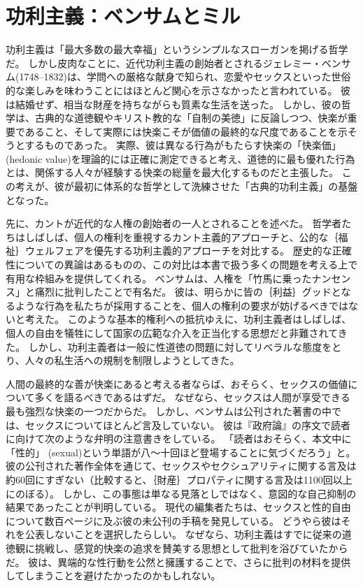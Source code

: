 \documentclass[paper=a4,book,openany]{jlreq}
\begin{document}
\section{功利主義：ベンサムとミル}

功利主義は「最大多数の最大幸福」というシンプルなスローガンを掲げる哲学だ。
しかし皮肉なことに、近代功利主義の創始者とされるジェレミー・ベンサム(1748--1832)は、学問への厳格な献身で知られ、恋愛やセックスといった世俗的な楽しみを味わうことにはほとんど関心を示さなかったと言われている。
彼は結婚せず、相当な財産を持ちながらも質素な生活を送った。
しかし、彼の哲学は、古典的な道徳観やキリスト教的な「自制の美徳」に反論しつつ、快楽が重要であること、そして実際には快楽こそが価値の最終的な尺度であることを示そうとするものであった。
実際、彼は異なる行為がもたらす快楽の「快楽価」(hedonic value)を理論的には正確に測定できると考え、道徳的に最も優れた行為とは、関係する人々が経験する快楽の総量を最大化するものだと主張した。
この考えが、彼が最初に体系的な哲学として洗練させた「古典的功利主義」の基盤となった。

先に、カントが近代的な人権の創始者の一人とされることを述べた。
哲学者たちはしばしば、個人の権利を重視するカント主義的アプローチと、公的な｛福祉｝{ウェルフェア}を優先する功利主義的アプローチを対比する。
歴史的な正確性についての異論はあるものの、この対比は本書で扱う多くの問題を考える上で有用な枠組みを提供してくれる。
ベンサムは、人権を「竹馬に乗ったナンセンス」と痛烈に批判したことで有名だ。
彼は、明らかに皆の｛利益｝{グッド}となるような行為を私たちが採用することを、個人の権利の要求が妨げるべきではないと考えた。
このような基本的権利への抵抗ゆえに、功利主義者はしばしば、個人の自由を犠牲にして国家の広範な介入を正当化する思想だと非難されてきた。
しかし、功利主義者は一般に性道徳の問題に対してリベラルな態度をとり、人々の私生活への規制を制限しようとしてきた。

人間の最終的な善が快楽にあると考える者ならば、おそらく、セックスの価値について多くを語るべきであるはずだ。
なぜなら、セックスは人間が享受できる最も強烈な快楽の一つだからだ。
しかし、ベンサムは公刊された著書の中では、セックスについてほとんど言及していない。
彼は『政府論』の序文で読者に向けて次のような弁明の注意書きをしている。
「読者はおそらく、本文中に「性的」 (sexual)という単語が八〜十回ほど登場することに気づくだろう」と\citep[p.533]{bentham77:_commen_commen_fragm_gover}。
彼の公刊された著作全体を通じて、セックスやセクシュアリティに関する言及は約60回にすぎない（比較すると、｛財産｝{プロパティ}に関する言及は1100回以上にのぼる）。
しかし、この事態は単なる見落としではなく、意図的な自己抑制の結果であったことが判明している。
現代の編集者たちは、セックスと性的自由について数百ページに及ぶ彼の未公刊の手稿を発見している。
どうやら彼はそれを公表しないことを選択したらしい。
なぜなら、功利主義はすでに従来の道徳観に挑戦し、感覚的快楽の追求を賛美する思想として批判を浴びていたからだ。
彼は、異端的な性行動を公然と擁護することで、さらに批判の材料を提供してしまうことを避けたかったのかもしれない。
\end{document}
